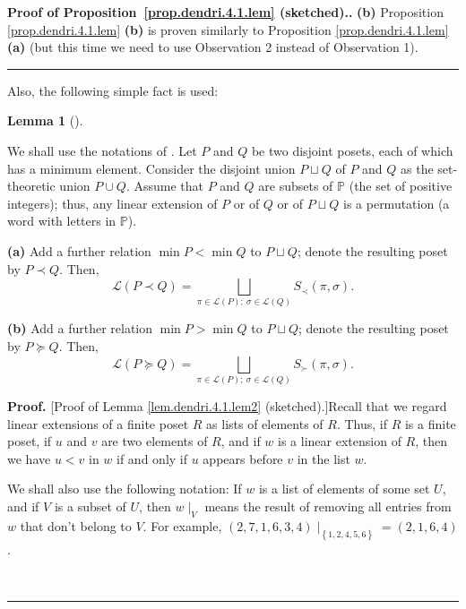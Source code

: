 \documentclass[numbers=enddot,12pt,final,onecolumn,notitlepage]{scrartcl}%
\theoremstyle{definition}
\newtheorem{lem}[theo]{Lemma}
\newenvironment{lemma}[1][]
{\begin{lem}[#1]\begin{leftbar}}
{\end{leftbar}\end{lem}}
\newenvironment{proof}[1][Proof]{\noindent\textbf{#1.} }{\ \rule{0.5em}{0.5em}}
\newenvironment{verlong}{}{}
\begin{document}
\begin{verlong}
\begin{proof}[Proof of Proposition~\ref{prop.dendri.4.1.lem} (sketched).]
\textbf{(b)} Proposition \ref{prop.dendri.4.1.lem} \textbf{(b)} is proven
similarly to Proposition \ref{prop.dendri.4.1.lem} \textbf{(a)}
(but this time we need to use Observation 2 instead of Observation 1).
\end{proof}

Also, the following simple fact is used:

\begin{lemma}
\label{lem.dendri.4.1.lem2}We shall use the notations of \cite[Section
5.2]{HopfComb}. Let $P$ and $Q$ be two disjoint posets, each of which has a
minimum element. Consider the disjoint union $P\sqcup Q$ of $P$ and $Q$ as the
set-theoretic union $P\cup Q$. Assume that $P$ and $Q$ are subsets of
$\mathbb{P}$ (the set of positive integers); thus, any linear extension of $P$
or of $Q$ or of $P\sqcup Q$ is a permutation (a word with letters in
$\mathbb{P}$).

\textbf{(a)} Add a further relation $\min P<\min Q$ to $P\sqcup Q$; denote the
resulting poset by $P\left.  \prec\right.  Q$. Then,
\[
\mathcal{L}\left(  P\left.  \prec\right.  Q\right)  =\bigsqcup_{\pi
\in\mathcal{L}\left(  P\right)  ;\ \sigma\in\mathcal{L}\left(  Q\right)
}S_{\prec}\left(  \pi,\sigma\right)  .
\]


\textbf{(b)} Add a further relation $\min P>\min Q$ to $P\sqcup Q$; denote the
resulting poset by $P\left.  \succeq\right.  Q$. Then,
\[
\mathcal{L}\left(  P\left.  \succeq\right.  Q\right)  =\bigsqcup_{\pi
\in\mathcal{L}\left(  P\right)  ;\ \sigma\in\mathcal{L}\left(  Q\right)
}S_{\succ}\left(  \pi,\sigma\right)  .
\]

\end{lemma}

\begin{proof}
[Proof of Lemma \ref{lem.dendri.4.1.lem2} (sketched).]Recall that we regard
linear extensions of a finite poset $R$ as lists of elements of $R$. Thus, if
$R$ is a finite poset, if $u$ and $v$ are two elements of $R$, and if $w$ is a
linear extension of $R$, then we have $u<v$ in $w$ if and only if $u$ appears
before $v$ in the list $w$.

We shall also use the following notation: If $w$ is a list of elements of some
set $U$, and if $V$ is a subset of $U$, then $w\mid_{V}$ means the result of
removing all entries from $w$ that don't belong to $V$. For example, $\left(
2,7,1,6,3,4\right)  \mid_{\left\{  1,2,4,5,6\right\}  }=\left(
2,1,6,4\right)  $.


\end{proof}
\end{verlong}
\end{document}
